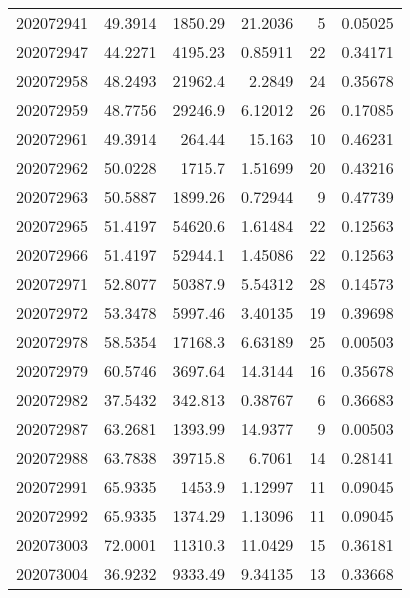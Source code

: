 \begin{tabular}{rrrrrr}
 202072941 &         49.3914  &     1850.29   &           21.2036  &           5 & 0.05025 \\
 202072947 &         44.2271  &     4195.23   &            0.85911 &          22 & 0.34171 \\
 202072958 &         48.2493  &    21962.4    &            2.2849  &          24 & 0.35678 \\
 202072959 &         48.7756  &    29246.9    &            6.12012 &          26 & 0.17085 \\
 202072961 &         49.3914  &      264.44   &           15.163   &          10 & 0.46231 \\
 202072962 &         50.0228  &     1715.7    &            1.51699 &          20 & 0.43216 \\
 202072963 &         50.5887  &     1899.26   &            0.72944 &           9 & 0.47739 \\
 202072965 &         51.4197  &    54620.6    &            1.61484 &          22 & 0.12563 \\
 202072966 &         51.4197  &    52944.1    &            1.45086 &          22 & 0.12563 \\
 202072971 &         52.8077  &    50387.9    &            5.54312 &          28 & 0.14573 \\
 202072972 &         53.3478  &     5997.46   &            3.40135 &          19 & 0.39698 \\
 202072978 &         58.5354  &    17168.3    &            6.63189 &          25 & 0.00503 \\
 202072979 &         60.5746  &     3697.64   &           14.3144  &          16 & 0.35678 \\
 202072982 &         37.5432  &      342.813  &            0.38767 &           6 & 0.36683 \\
 202072987 &         63.2681  &     1393.99   &           14.9377  &           9 & 0.00503 \\
 202072988 &         63.7838  &    39715.8    &            6.7061  &          14 & 0.28141 \\
 202072991 &         65.9335  &     1453.9    &            1.12997 &          11 & 0.09045 \\
 202072992 &         65.9335  &     1374.29   &            1.13096 &          11 & 0.09045 \\
 202073003 &         72.0001  &    11310.3    &           11.0429  &          15 & 0.36181 \\
 202073004 &         36.9232  &     9333.49   &            9.34135 &          13 & 0.33668 \\

\end{tabular}

